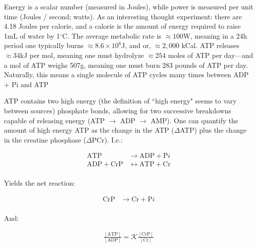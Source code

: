 Energy is a scalar number (measured in Joules), while power is measured per unit time (Joules / second; watts). As an interesting thought experiment: there are 4.18 Joules per calorie, and a calorie is the amount of energy required to raise 1mL of water by 1$^\circ$C. The average metabolic rate is $\approx 100$W, meaning in a 24h period one typically burns $\approx 8.6 \times 10^6$J, and or, $\approx 2,000$ kCal. ATP releases $\approx 34$kJ per mol, meaning one must hydrolyze $\approx 254$ moles of ATP per day---and a mol of ATP weighs 507g, meaning one must burn 283 pounds of ATP per day. Naturally, this means a single molecule of ATP cycles many times between ADP + Pi and ATP \newline 

ATP contains two high energy (the definition of         ``high energy" seems to vary between sources) phosphate bonds, allowing for two successive breakdowns capable of releasing energy (ATP $\rightarrow$ ADP $\rightarrow$ AMP). One can quantify the amount of high energy ATP as the change in the ATP ($\Delta$ATP) plus the change in the creatine phosphase ($\Delta$PCr). I.e.: 

\begin{equation}
\begin{split}
    \mathrm{ATP} &\rightarrow \mathrm{ADP} + \mathrm{P}i \\
    \mathrm{ADP} + \mathrm{CrP} & \leftrightarrow \mathrm{ATP} + \mathrm{Cr} \\
\end{split}
\end{equation}

Yields the net reaction: 

\begin{equation}
\begin{split}
    \mathrm{CrP} &\rightarrow \mathrm{Cr} + \mathrm{P}i \\
\end{split}
\end{equation}

And: 

\begin{equation}
\begin{split}
    \frac{[\mathrm{ATP}]}{[\mathrm{ADP}]} = \mathcal{K} \frac{[\mathrm{CrP}]}{[\mathrm{Cr}]}
\end{split}
\end{equation}







